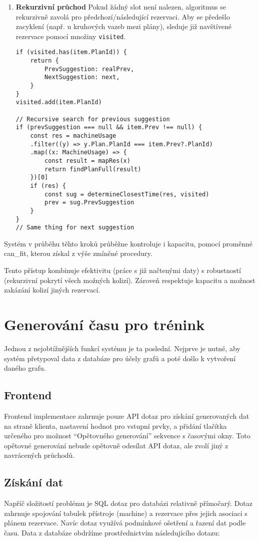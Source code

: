 \begin{enumerate}
    \item \textbf{Rekurzivní průchod}
    Pokud žádný slot není nalezen, algoritmus se rekurzivně zavolá pro předchozí/následující rezervaci. Aby se předešlo zacyklení (např. u kruhových vazeb mezi plány), sleduje již navštívené rezervace pomocí množiny \texttt{visited}. 

    \begin{lstlisting}
if (visited.has(item.PlanId)) {
    return {
	    PrevSuggestion: realPrev,
	    NextSuggestion: next,
    }
}
visited.add(item.PlanId)

// Recursive search for previous suggestion
if (prevSuggestion === null && item.Prev !== null) {
    const res = machineUsage
	.filter((y) => y.Plan.PlanId === item.Prev?.PlanId)
	.map((x: MachineUsage) => {
	    const result = mapRes(x)
	    return findPlanFull(result)
	})[0]
    if (res) {
	    const sug = determineClosestTime(res, visited)
	    prev = sug.PrevSuggestion
    }
}
// Same thing for next suggestion
    \end{lstlisting}
\end{enumerate}
Systém v průběhu těhto kroků průběžne kontroluje i kapacitu, pomocí proměnné can\_fit, kterou získal z výše zmíněné procedury. 

Tento přístup kombinuje efektivitu (práce s již načtenými daty) s robustností (rekurzivní pokrytí všech možných kolizí). Zároveň respektuje kapacitu a možnost zakázání kolizí jiných rezervací.

\section{Generování času pro trénink}
Jednou z nejobtížnějších funkcí systému je ta poslední. Nejprve je nutné, aby systém přetypoval data z databáze pro účely grafů a poté došlo k vytvoření daného grafu.

\subsection{Frontend}
Frontend implementace zahrnuje pouze API dotaz pro získání generovaných dat na straně klienta, nastavení hodnot pro vstupní prvky, a přidání tlačítka určeného pro možnost ``Opětovného generování'' sekvence s časovými okny. Toto opětovné generování nebude opětovně odesílat API dotaz, ale zvolí jiný z navrácených průchodů.

\subsection{Získání dat}
Napříč složitostí problému je SQL dotaz pro databázi relativně přímočarý. Dotaz zahrnuje spojování tabulek přístroje (machine) a rezervace přes jejich asociaci s plánem rezervace. Navíc dotaz využívá podmínkové ošetření a řazení dat podle času. Data z databáze obdržíme prostřednictvím následujícího dotazu:

